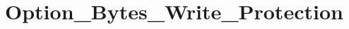 \hypertarget{group___option___bytes___write___protection}{\section{Option\-\_\-\-Bytes\-\_\-\-Write\-\_\-\-Protection}
\label{group___option___bytes___write___protection}
}
